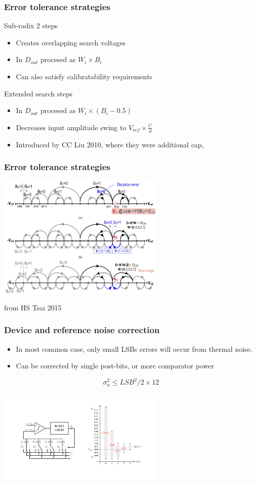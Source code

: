 \documentclass[aspectratio=169]{beamer}
\begin{document}
\begin{frame}
  \frametitle{Error tolerance strategies}
  Sub-radix 2 steps
  \begin{itemize}
    \item Creates overlapping search voltages
    \item In $D_{out}$ procesed as $W_i \times B_i$
    \item Can also satisfy calibratability requirements
  \end{itemize}
  Extended search steps
  \begin{itemize}
    \item In $D_{out}$ procesed as $W_i \times (B_i-0.5)$
    \item Decreases input amplitude swing to $V_{ref} \times \frac{C}{d}$
    \item Introduced by CC Liu 2010, where they were additional cap, 
  \end{itemize}
  \end{frame}

\begin{frame}
  \frametitle{Error tolerance strategies}
  \begin{center}
    \includegraphics[width=0.6\textwidth]{redun_strats.png}
  \end{center}
  from HS Tsai 2015
  \end{frame}


\begin{frame}
\frametitle{Device and reference noise correction}
\begin{itemize}
  \item In most common case, only small LSBs errors will occur from thermal noise.
  \item Can be corrected by single post-bits, or more comparator power
\end{itemize}
\begin{equation*}
\sigma_n^2 \leq LSB^2 / 2 \times 12
\end{equation*}
\begin{center}
\includegraphics[width=0.6\textwidth]{tranchar3.pdf}
\end{center}
\end{frame}
\end{document}
